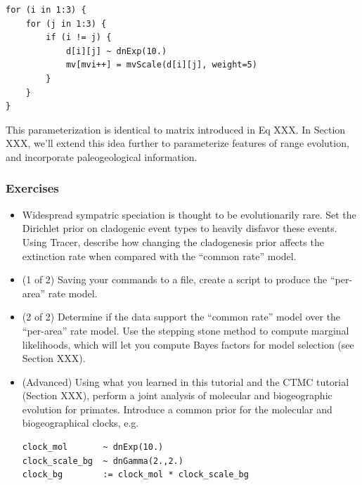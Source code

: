 \begin{snugshade}
\begin{lstlisting}
for (i in 1:3) {
    for (j in 1:3) {
        if (i != j) {
            d[i][j] ~ dnExp(10.)
            mv[mvi++] = mvScale(d[i][j], weight=5)
        }
    }
}
\end{lstlisting}
\end{snugshade}

This parameterization is identical to matrix introduced in Eq XXX.
In Section XXX, we'll extend this idea further to parameterize features of range evolution, and incorporate paleogeological information.

\subsubsection{Exercises}

\begin{itemize}
\item Widespread sympatric speciation is thought to be evolutionarily rare. Set the Dirichlet prior on cladogenic event types to heavily disfavor these events. Using Tracer, describe how changing the cladogenesis prior affects the extinction rate when compared with the ``common rate'' model.
\item (1 of 2) Saving your commands to a file, create a script to produce the ``per-area'' rate model.
\item (2 of 2) Determine if the data support the ``common rate'' model over the ``per-area'' rate model. Use the stepping stone method to compute marginal likelihoods, which will let you compute Bayes factors for model selection (see Section XXX).
\item (Advanced) Using what you learned in this tutorial and the CTMC tutorial (Section XXX), perform a joint analysis of molecular and biogeographic evolution for primates. Introduce a common prior for the molecular and biogeographical clocks, e.g.
\begin{snugshade}
\begin{lstlisting}
clock_mol       ~ dnExp(10.)
clock_scale_bg  ~ dnGamma(2.,2.)
clock_bg        := clock_mol * clock_scale_bg
\end{lstlisting}
\end{snugshade}
\end{itemize}



